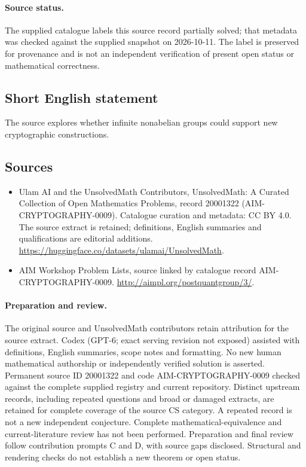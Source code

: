 \documentclass[11pt]{article}
\begin{document}
\paragraph{Source status.}
The supplied catalogue labels this source record partially solved; that metadata was checked against the supplied snapshot on 2026-10-11. The label is preserved for provenance and is not an independent verification of present open status or mathematical correctness.
\subsection{Short English statement}
The source explores whether infinite nonabelian groups could support new cryptographic constructions.
\subsection{Sources}
\begin{itemize}
\item[\hypertarget{source:20001322:1}{S1}] Ulam AI and the UnsolvedMath Contributors, UnsolvedMath: A Curated Collection of Open Mathematics Problems, record 20001322 (AIM-CRYPTOGRAPHY-0009). Catalogue curation and metadata: CC BY 4.0. The source extract is retained; definitions, English summaries and qualifications are editorial additions.
\url{https://huggingface.co/datasets/ulamai/UnsolvedMath}.
\item[\hypertarget{source:20001322:2}{S2}] AIM Workshop Problem Lists, source linked by catalogue record AIM-CRYPTOGRAPHY-0009.
\url{http://aimpl.org/postquantgroup/3/}.
\end{itemize}
\paragraph{Preparation and review.}
The original source and UnsolvedMath contributors retain attribution for the source extract. Codex (GPT-6; exact serving revision not exposed) assisted with definitions, English summaries, scope notes and formatting. No new human mathematical authorship or independently verified solution is asserted. Permanent source ID 20001322 and code AIM-CRYPTOGRAPHY-0009 checked against the complete supplied registry and current repository. Distinct upstream records, including repeated questions and broad or damaged extracts, are retained for complete coverage of the source CS category. A repeated record is not a new independent conjecture. Complete mathematical-equivalence and current-literature review has not been performed. Preparation and final review follow contribution prompts C and D, with source gaps disclosed. Structural and rendering checks do not establish a new theorem or open status.
\label{end:20001322}
\end{document}
